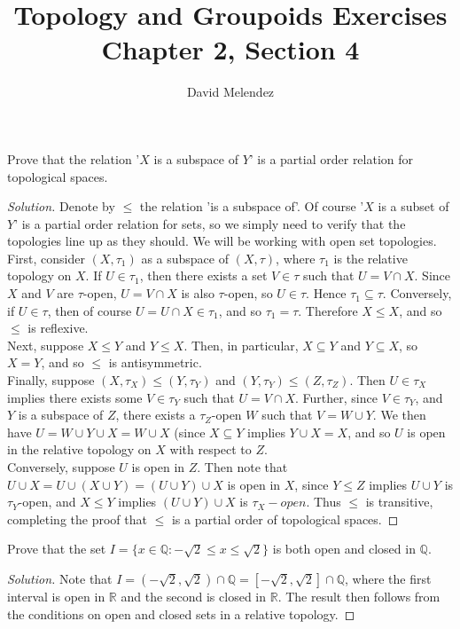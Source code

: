 \documentclass[12pt]{article}
\newenvironment{problem}[2][Problem]{\begin{trivlist}
\item[\hskip \labelsep {\bfseries #1}\hskip \labelsep {\bfseries #2.}]}{\end{trivlist}}
\newenvironment{solution}
  {\renewcommand\qedsymbol{$\blacksquare$}\begin{proof}[Solution]}
{\end{proof}}
\begin{document}
\title{Topology and Groupoids Exercises\\ \large Chapter 2, Section 4}
\author{David Melendez}
\maketitle

\begin{problem}{1}
  Prove that the relation '$X$ is a subspace of $Y$' is a partial
  order relation for topological spaces.
\end{problem}
\begin{solution}
  Denote by $\leq$ the relation 'is a subspace of'.
  Of course '$X$ is a subset of $Y$' is a partial order relation for
  sets, so we simply need to verify that the topologies line up as
  they should. We will be working with open set topologies.\\
  \indent First, consider $(X,\tau_1)$ as a subspace of $(X,\tau)$,
  where $\tau_1$ is the relative topology on $X$.
  If $U\in\tau_1$, then there exists a set $V\in\tau$ such that
  $U=V\cap X$.
  Since $X$ and $V$ are $\tau$-open, $U=V\cap X$ is also $\tau$-open,
  so $U\in\tau$.
  Hence $\tau_1\subseteq\tau$.
  Conversely, if $U\in\tau$, then of course $U=U\cap X\in\tau_1$,
  and so $\tau_1=\tau$.
  Therefore $X\leq X$, and so $\leq$ is reflexive.\\
  \indent Next, suppose $X\leq Y$ and $Y\leq X$.
  Then, in particular, $X\subseteq Y$ and $Y\subseteq X$, so $X=Y$,
  and so $\leq$ is antisymmetric.\\
  \indent Finally, suppose $(X,\tau_X)\leq(Y,\tau_Y)$ and
  $(Y,\tau_Y)\leq(Z,\tau_Z)$.
  Then $U\in\tau_X$ implies there exists some $V\in\tau_Y$ such that
  $U = V\cap X$.
  Further, since $V\in\tau_Y$, and $Y$ is a subspace of $Z$, there
  exists a $\tau_Z$-open $W$ such that $V=W\cup Y$.
  We then have $U=W\cup Y\cup X = W\cup X$ (since $X\subseteq Y$
  implies $Y\cup X=X$, and so $U$ is open in the relative
  topology on $X$ with respect to $Z$. \\
  \indent Conversely, suppose $U$ is open in $Z$.
  Then note that $U\cup X=U\cup(X\cup Y)=(U\cup Y)\cup X$ is open in $X$,
  since $Y\leq Z$ implies $U\cup Y$ is $\tau_Y$-open, and 
  $X\leq Y$ implies $(U\cup Y)\cup X$ is $\tau_X-open$.
  Thus $\leq$ is transitive, completing the proof that $\leq$ is a
  partial order of topological spaces.
\end{solution}

\begin{problem}{2}
  Prove that the set $I=\{x\in\mathbb{Q} : -\sqrt2\leq x\leq \sqrt2\}$
  is both open and closed in $\mathbb{Q}$.
\end{problem}
\begin{solution}
  Note that $I=\left(-\sqrt2,\sqrt2\right)\cap\mathbb{Q}
  =\left[-\sqrt2,\sqrt2\right]\cap\mathbb{Q}$, where the first interval is
  open in $\mathbb{R}$ and the second is closed in $\mathbb{R}$.
  The result then follows from the conditions on open and closed sets
  in a relative topology.
\end{solution}
\end{document}
